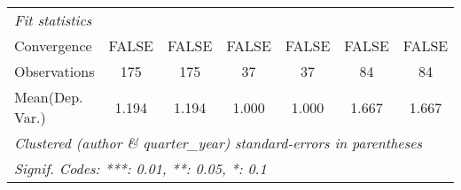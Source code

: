 \begin{tabular}{lcccccc}
   \midrule
   \emph{Fit statistics}\\
   Convergence                           &FALSE       & FALSE      & FALSE         & FALSE         & FALSE         & FALSE\\  
   Observations                          & 175        & 175        & 37            & 37            & 84            & 84\\  
Mean(Dep. Var.) & 1.194 & 1.194 & 1.000 & 1.000 & 1.667 & 1.667 \\
   \midrule \midrule
   \multicolumn{7}{l}{\emph{Clustered (author \& quarter\_year) standard-errors in parentheses}}\\
   \multicolumn{7}{l}{\emph{Signif. Codes: ***: 0.01, **: 0.05, *: 0.1}}\\
\end{tabular}
\par\endgroup
